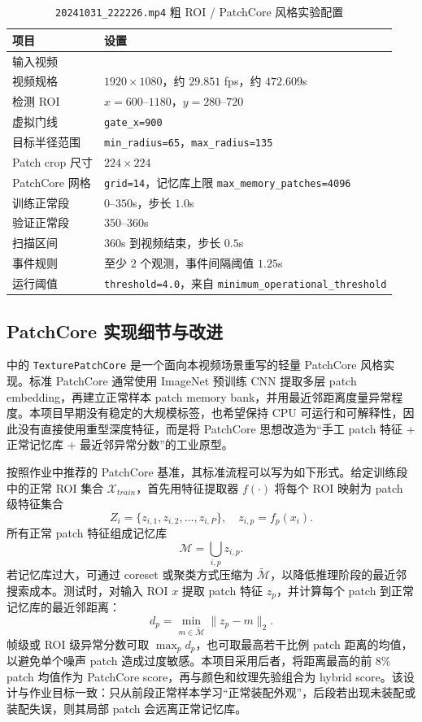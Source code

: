 \documentclass[a4paper,12pt]{article}
\newcommand{\code}[1]{\texttt{#1}}
\begin{document}
\begin{table}[H]
\centering
\caption{\code{20241031\_222226.mp4} 粗 ROI / PatchCore 风格实验配置}
\label{tab:video-a-config}
\small
\begin{tabularx}{\textwidth}{L{0.34\textwidth}Y}
\toprule
项目 & 设置 \\
\midrule
输入视频 &  \\
视频规格 & $1920\times1080$，约 $29.851$ fps，约 $472.609$s \\
检测 ROI & $x=600$--$1180$，$y=280$--$720$ \\
虚拟门线 & \code{gate\_x=900} \\
目标半径范围 & \code{min\_radius=65}，\code{max\_radius=135} \\
Patch crop 尺寸 & $224\times224$ \\
PatchCore 网格 & \code{grid=14}，记忆库上限 \code{max\_memory\_patches=4096} \\
训练正常段 & $0$--$350$s，步长 $1.0$s \\
验证正常段 & $350$--$360$s \\
扫描区间 & $360$s 到视频结束，步长 $0.5$s \\
事件规则 & 至少 $2$ 个观测，事件间隔阈值 $1.25$s \\
运行阈值 & \code{threshold=4.0}，来自 \code{minimum\_operational\_threshold} \\
\bottomrule
\end{tabularx}
\end{table}

\subsection{PatchCore 实现细节与改进}
 中的 \code{TexturePatchCore} 是一个面向本视频场景重写的轻量 PatchCore 风格实现。标准 PatchCore 通常使用 ImageNet 预训练 CNN 提取多层 patch embedding，再建立正常样本 patch memory bank，并用最近邻距离度量异常程度。本项目早期没有稳定的大规模标签，也希望保持 CPU 可运行和可解释性，因此没有直接使用重型深度特征，而是将 PatchCore 思想改造为“手工 patch 特征 + 正常记忆库 + 最近邻异常分数”的工业原型。

按照作业中推荐的 PatchCore 基准，其标准流程可以写为如下形式。给定训练段中的正常 ROI 集合 $\mathcal{X}_{train}$，首先用特征提取器 $f(\cdot)$ 将每个 ROI 映射为 patch 级特征集合
\[
    Z_i = \{z_{i,1}, z_{i,2}, \ldots, z_{i,P}\}, \quad z_{i,p}=f_p(x_i).
\]
所有正常 patch 特征组成记忆库
\[
    \mathcal{M}=\bigcup_{i,p} z_{i,p}.
\]
若记忆库过大，可通过 coreset 或聚类方式压缩为 $\tilde{\mathcal{M}}$，以降低推理阶段的最近邻搜索成本。测试时，对输入 ROI $x$ 提取 patch 特征 $z_p$，并计算每个 patch 到正常记忆库的最近邻距离：
\[
    d_p = \min_{m\in\tilde{\mathcal{M}}} \|z_p-m\|_2.
\]
帧级或 ROI 级异常分数可取 $\max_p d_p$，也可取最高若干比例 patch 距离的均值，以避免单个噪声 patch 造成过度敏感。本项目采用后者，将距离最高的前 $8\%$ patch 均值作为 PatchCore score，再与颜色和纹理先验组合为 hybrid score。该设计与作业目标一致：只从前段正常样本学习“正常装配外观”，后段若出现未装配或装配失误，则其局部 patch 会远离正常记忆库。
\end{document}
